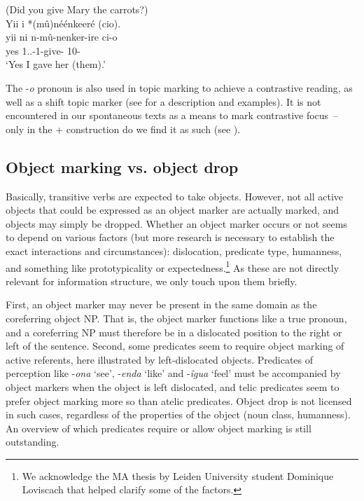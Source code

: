 \documentclass[output=paper]{langscibook}
\begin{document}
\z

\ex
\label{bkm:Ref116889753}
(Did you give Mary the carrots?)\\
Yii i *(mû)néénkeeré (cio).\\
\gll
yii   ni  n-mû-nenker-ire  ci-o\\
yes \FOC{}  1.\SG.\SM{}-1\OM{}-give-\PFV{}  10-\PRO{}\\
\glt
‘Yes I gave her (them).’

\z

The -\textit{o} pronoun is also used in topic marking to achieve a contrastive reading, as well as a shift topic marker (see  for a description and examples). It is not encountered in our spontaneous texts as a means to mark contrastive focus~– only in the \NI+\PRO{} construction do we find it as such (see ).

\subsection{Object marking vs. object drop}

Basically, transitive verbs are expected to take objects. However, not all active objects that could be expressed as an object marker are actually marked, and objects may simply be dropped. Whether an object marker occurs or not seems to depend on various factors (but more research is necessary to establish the exact interactions and circumstances): dislocation, predicate type, humanness, and something like prototypicality or expectedness.\footnote{We acknowledge the MA thesis by Leiden University student Dominique Loviscach that helped clarify some of the factors.} As these are not directly relevant for information structure, we only touch upon them briefly.

First, an object marker may never be present in the same domain as the coreferring object NP. That is, the object marker functions like a true pronoun, and a coreferring NP must therefore be in a dislocated position to the right or left of the sentence. Second, some predicates seem to require object marking of active referents, here illustrated by left-dislocated objects. Predicates of perception like -\textit{ona} ‘see’, -\textit{enda} ‘like’  and -\textit{îgua} ‘feel’  must be accompanied by object markers when the object is left dislocated, and telic predicates seem to prefer object marking more so than atelic predicates. Object drop is not licensed in such cases, regardless of the properties of the object (noun class, humanness). An overview of which predicates require or allow object marking is still outstanding.\largerpage[2]
\end{document}
